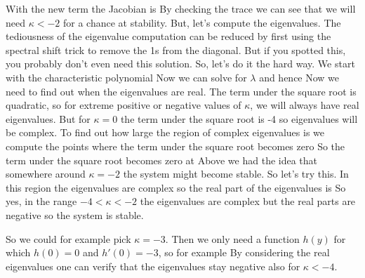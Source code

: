 \solution 
With the new term the Jacobian is 
By checking the trace we can see that we will need $\kappa<-2$ for a chance at stability. But, let's compute the eigenvalues. The tediousness of the eigenvalue computation can be reduced by first using the spectral shift trick to remove the 1s from the diagonal. But if you spotted this, you probably don't even need this solution. So, let's do it the hard way. We start with the characteristic polynomial
Now we can solve for $\lambda$
and hence 
Now we need to find out when the eigenvalues are real. The term under the square root is quadratic, so for extreme positive or negative values of $\kappa$, we will always have real eigenvalues. But for $\kappa=0$ the term under the square root is -4 so eigenvalues will be complex. To find out how large the region of complex eigenvalues is we compute the points where the term under the square root becomes zero 
So the term under the square root becomes zero at
Above we had the idea that somewhere around $\kappa=-2$ the system might become stable. So let's try this. In this region the eigenvalues are complex so the real part of the eigenvalues is 
So yes, in the range $-4<\kappa<-2$ the eigenvalues are complex but the real parts are negative so the system is stable.

So we could for example pick $\kappa=-3$. Then we only need a function $h(y)$ for which $h(0)=0$ and $h'(0)=-3$, so for example 
By considering the real eigenvalues one can verify that the eigenvalues stay negative also for $\kappa<-4$.
